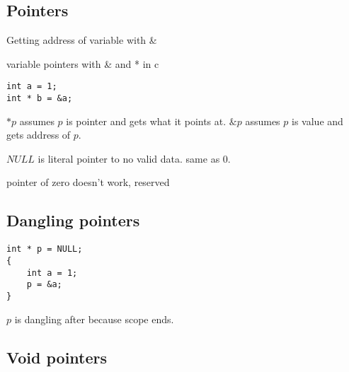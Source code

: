 
\subsection{Pointers}
Getting address of variable with \&


variable pointers with \& and * in c

\begin{verbatim}
int a = 1;
int * b = &a;
\end{verbatim}
\(*p\) assumes \(p\) is pointer and gets what it points at. \(\&p\) assumes \(p\) is value and gets address of \(p\).


\(NULL\) is literal pointer to no valid data. same as \(0\).

pointer of zero doesn't work, reserved

\subsection{Dangling pointers}

\begin{verbatim}
int * p = NULL;
{
	int a = 1;
	p = &a;
}
\end{verbatim}

\(p\) is dangling after because scope ends.


\subsection{Void pointers}

